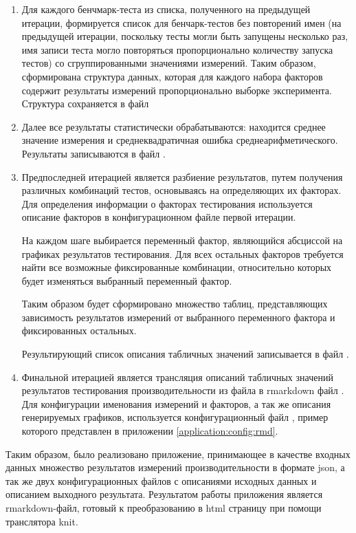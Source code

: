 \begin{enumerate}
	\item Для каждого бенчмарк-теста из списка, полученного на предыдущей итерации, формируется список для бенчарк-тестов без повторений имен (на предыдущей итерации, поскольку тесты могли быть запущены несколько раз, имя записи теста могло повторяться пропорционально количеству запуска тестов) со сгруппированными значениями измерений. Таким образом, сформирована структура данных, которая для каждого набора факторов содержит результаты измерений пропорционально выборке эксперимента. Структура сохраняется в файл 
	
	\item Далее все результаты статистически обрабатываются: находится среднее значение измерения и среднеквадратичная ошибка среднеарифметического. Результаты записываются в файл .
	
	\item Предпоследней итерацией является разбиение результатов, путем получения различных комбинаций тестов, основываясь на определяющих их факторах. Для определения информации о факторах тестирования используется описание факторов в конфигурационном файле первой итерации.
	
	На каждом шаге выбирается переменный фактор, являющийся абсциссой на графиках результатов тестирования. Для всех остальных факторов требуется найти все возможные фиксированные комбинации, относительно которых будет изменяться выбранный переменный фактор.
	
	Таким образом будет сформировано множество таблиц, представляющих зависимость результатов измерений от выбранного переменного фактора и фиксированных остальных.
	
	Результирующий список описания табличных значений записывается в файл .
	
	\item Финальной итерацией является трансляция описаний табличных значений результатов тестирования производительности из файла  в rmarkdown файл . Для конфигурации именования измерений и факторов, а так же описания генерируемых графиков, используется конфигурационный файл , пример которого представлен в приложении \ref{application:config:rmd}.
\end{enumerate}

Таким образом, было реализовано приложение, принимающее в качестве входных данных множество результатов измерений производительности в формате json, а так же двух конфигурационных файлов с описаниями исходных данных и описанием выходного результата. Результатом работы приложения является rmarkdown-файл, готовый к преобразованию в html страницу при помощи транслятора knit.